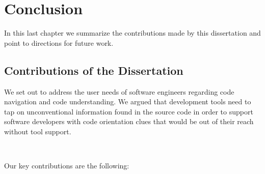 \chapter{Conclusion}
\label{the conclusion}

In this last chapter we summarize the contributions made by this dissertation and point to directions for future work.

\section{Contributions of the Dissertation}

We set out to address the user needs of software engineers regarding code navigation and code understanding. We argued that development tools need to tap on unconventional information found in the source code in order to support software developers with code orientation clues that would be out of their reach without tool support. 

~

\noindent Our key contributions are the following:

